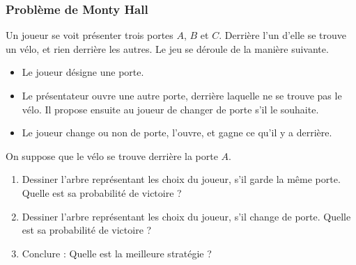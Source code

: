 \documentclass[12pt]{article}
\begin{document}
\subsubsection*{Problème de Monty Hall}

Un joueur se voit présenter trois portes $A$, $B$ et $C$. Derrière l'un d'elle se trouve un vélo, et rien derrière les autres. Le jeu se déroule de la manière suivante.
\begin{itemize}
  \item Le joueur désigne une porte.
  \item Le présentateur ouvre une autre porte, derrière laquelle ne se trouve pas le vélo. Il propose ensuite au joueur de changer de porte s'il le souhaite.
  \item Le joueur change ou non de porte, l'ouvre, et gagne ce qu'il y a derrière.
\end{itemize}
On suppose que le vélo se trouve derrière la porte $A$.
\begin{enumerate}
  \item Dessiner l'arbre représentant les choix du joueur, s'il garde la même porte. Quelle est sa probabilité de victoire ?
  \item Dessiner l'arbre représentant les choix du joueur, s'il change de porte. Quelle est sa probabilité de victoire ?
  \item Conclure : Quelle est la meilleure stratégie ?
\end{enumerate}
\end{document}
